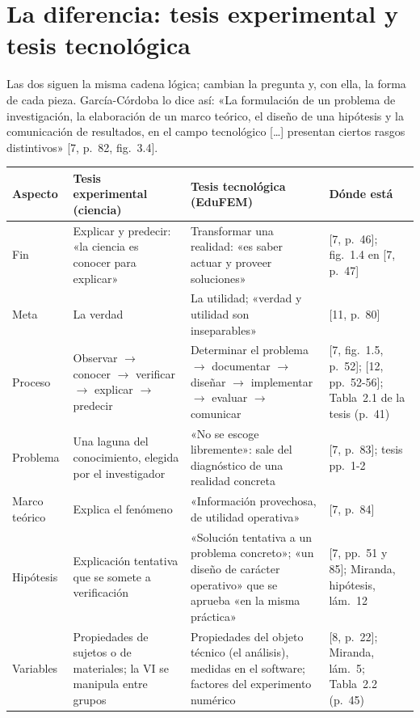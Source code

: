 \documentclass[11pt,a4paper]{article}
\begin{document}
\section{La diferencia: tesis experimental y tesis tecnológica}\label{sec:diferencia}

Las dos siguen la misma cadena lógica; cambian la pregunta y, con ella, la forma de cada pieza. García-Córdoba lo dice así: «La formulación de un problema de investigación, la elaboración de un marco teórico, el diseño de una hipótesis y la comunicación de resultados, en el campo tecnológico [\ldots] presentan ciertos rasgos distintivos» [7, p.~82, fig.~3.4].

{\small
\begin{longtable}{@{}L{2.4cm}L{4.05cm}L{4.95cm}L{3.9cm}@{}}
\toprule
\textbf{Aspecto} & \textbf{Tesis experimental (ciencia)} & \textbf{Tesis tecnológica (EduFEM)} & \textbf{Dónde está}\\
\midrule\endhead
\bottomrule\endfoot
Fin & Explicar y predecir: «la ciencia es conocer para explicar» & Transformar una realidad: «es saber actuar y proveer soluciones» & [7, p.~46]; fig.~1.4 en [7, p.~47]\\
Meta & La verdad & La utilidad; «verdad y utilidad son inseparables» & [11, p.~80]\\
Proceso & Observar $\to$ conocer $\to$ verificar $\to$ explicar $\to$ predecir & Determinar el problema $\to$ documentar $\to$ diseñar $\to$ implementar $\to$ evaluar $\to$ comunicar & [7, fig.~1.5, p.~52]; [12, pp.~52-56]; Tabla~2.1 de la tesis (p.~41)\\
Problema & Una laguna del conocimiento, elegida por el investigador & «No se escoge libremente»: sale del diagnóstico de una realidad concreta & [7, p.~83]; tesis pp.~1-2\\
Marco teórico & Explica el fenómeno & «Información provechosa, de utilidad operativa» & [7, p.~84]\\
Hipótesis & Explicación tentativa que se somete a verificación & «Solución tentativa a un problema concreto»; «un diseño de carácter operativo» que se aprueba «en la misma práctica» & [7, pp.~51 y 85]; Miranda, hipótesis, lám.~12\\
Variables & Propiedades de sujetos o de materiales; la VI se manipula entre grupos & Propiedades del objeto técnico (el análisis), medidas en el software; factores del experimento numérico & [8, p.~22]; Miranda, lám.~5; Tabla~2.2 (p.~45)\\

\end{longtable}}
\end{document}
